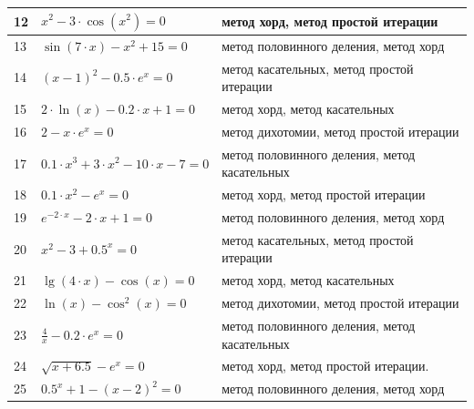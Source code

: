 {\begin{longtable}{|l|l|p{}|}
12 &$x^2-3\cdot \cos (x^2)=0$ &метод хорд, метод простой итерации\\\hline
13 &$\sin (7\cdot x)-x^2+15=0$ &метод половинного деления, метод хорд\\\hline
14 &$(x-1)^2-0.5\cdot e^x=0$ &метод касательных, метод простой итерации\\\hline
15 &$2\cdot \ln (x)-0.2\cdot x+1=0$ &метод хорд, метод касательных\\\hline
16 &$2-x\cdot e^x=0$ &метод дихотомии, метод простой итерации\\\hline
17 &$0.1\cdot x^3+3\cdot x^2-10\cdot x-7=0$ &метод половинного деления, метод касательных\\\hline
18 &$0.1\cdot x^2-e^x=0$ &метод хорд, метод простой итерации\\\hline
19 &$e^{-2\cdot x}-2\cdot x+1=0$ &метод половинного деления, метод хорд\\\hline
20 &$x^2-3+0.5^x=0$ &метод касательных, метод простой итерации\\\hline
21 &$\lg(4\cdot x)-\cos (x)=0$ &метод хорд, метод касательных\\\hline
22 &$\ln(x)-\cos^2(x)=0$ &метод дихотомии, метод простой итерации\\\hline
23 &$\frac{4}{x}-0.2\cdot e^x=0$ &метод половинного деления, метод касательных\\\hline
24 &$\sqrt{x+6.5}-e^x=0$ &метод хорд, метод простой итерации.\\\hline
25 &$0.5^x+1-(x-2)^2=0$ &метод половинного деления, метод хорд\\\hline
\end{longtable}
}

